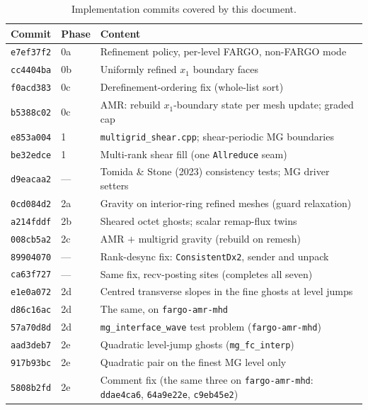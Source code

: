 \documentclass[11pt]{article}
\newcommand{\code}[1]{\texttt{#1}}
\newcommand{\file}[1]{\texttt{\small #1}}
\newcommand{\fn}[1]{\texttt{\small #1}}
\begin{document}
\begin{table}[htb]
\centering
\small
\begin{tabular}{@{}llp{7.6cm}@{}}
\toprule
Commit & Phase & Content \\
\midrule
\code{e7ef37f2} & 0a & Refinement policy, per-level FARGO, non-FARGO mode \\
\code{cc4404ba} & 0b & Uniformly refined $x_1$ boundary faces \\
\code{f0acd383} & 0c & Derefinement-ordering fix (whole-list sort) \\
\code{b5388c02} & 0c & AMR: rebuild $x_1$-boundary state per mesh update; graded cap \\
\code{e853a004} & 1  & \file{multigrid\_shear.cpp}; shear-periodic MG boundaries \\
\code{be32edce} & 1  & Multi-rank shear fill (one \code{Allreduce} seam) \\
\code{d9eacaa2} & --- & Tomida \& Stone (2023) consistency tests; MG driver setters \\
\code{0cd084d2} & 2a & Gravity on interior-ring refined meshes (guard relaxation) \\
\code{a214fddf} & 2b & Sheared octet ghosts; scalar remap-flux twins \\
\code{008cb5a2} & 2c & AMR $+$ multigrid gravity (rebuild on remesh) \\
\code{89904070} & --- & Rank-desync fix: \fn{ConsistentDx2}, sender and unpack \\
\code{ca63f727} & --- & Same fix, recv-posting sites (completes all seven) \\
\code{e1e0a072} & 2d & Centred transverse slopes in the fine ghosts at level jumps \\
\code{d86c16ac} & 2d & The same, on \code{fargo-amr-mhd} \\
\code{57a70d8d} & 2d & \code{mg\_interface\_wave} test problem (\code{fargo-amr-mhd}) \\
\code{aad3deb7} & 2e & Quadratic level-jump ghosts (\code{mg\_fc\_interp}) \\
\code{917b93bc} & 2e & Quadratic pair on the finest MG level only \\
\code{5808b2fd} & 2e & Comment fix (the same three on \code{fargo-amr-mhd}: \code{ddae4ca6}, \code{64a9e22e}, \code{c9eb45e2}) \\
\bottomrule
\end{tabular}
\caption{Implementation commits covered by this document.}
\label{tab:commits}
\end{table}
\end{document}
